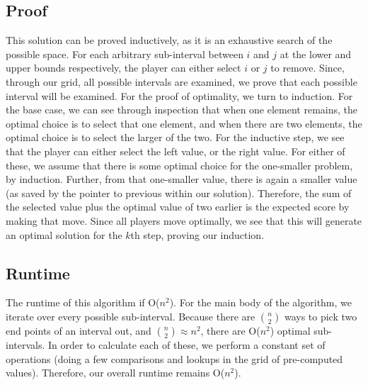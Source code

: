 \documentclass[titlepage]{article}
\numberwithin{equation}{subsection}
\begin{document}
\subsection{Proof}
This solution can be proved inductively, as it is an exhaustive search of the possible space. For each arbitrary sub-interval between $i$ and $j$
at the lower and upper bounds respectively, the player can either select $i$ or $j$ to remove. Since, through our grid, all possible intervals
are examined, we prove that each possible interval will be examined. For the proof of optimality, we turn to induction. For the base case,
we can see through inspection that when one element remains, the optimal choice is to select that one element, and when there are two elements,
the optimal choice is to select the larger of the two. For the inductive step, we see that the player can either select the left value, or 
the right value. For either of these, we assume that there is some optimal choice for the one-smaller problem, by induction. Further, from
that one-smaller value, there is again a smaller value (as saved by the pointer to previous within our solution). Therefore, the sum of
the selected value plus the optimal value of two earlier is the expected score by making that move. Since all players move optimally, we
see that this will generate an optimal solution for the $k$th step, proving our induction.
\subsection{Runtime}
The runtime of this algorithm if O($n^2$). For the main body of the algorithm, we iterate over every possible sub-interval. Because
there are $n\choose 2$ ways to pick two end points of an interval out, and ${n \choose 2} \approx n^2$, there are O($n^2$) optimal sub-intervals.
In order to calculate each of these, we perform a constant set of operations (doing a few comparisons and lookups in the grid of pre-computed values).
Therefore, our overall runtime remains O($n^2$).
\end{document}

